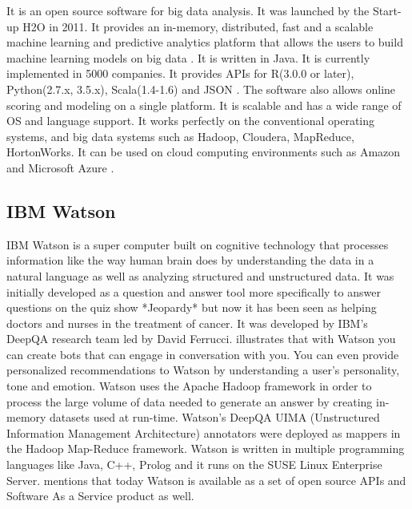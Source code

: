     It is an open source software for big data analysis. It was
    launched by the Start-up H2O in 2011. It provides an in-memory,
    distributed, fast and a scalable machine learning and predictive
    analytics platform that allows the users to build machine learning
    models on big data \cite{www-H2O-website}. It is written in
    Java. It is currently implemented in 5000 companies. It provides
    APIs for R(3.0.0 or later), Python(2.7.x, 3.5.x), Scala(1.4-1.6)
    and JSON \cite{www-H2O-book}. The software also allows online
    scoring and modeling on a single platform.  It is scalable and has
    a wide range of OS and language support. It works perfectly on the
    conventional operating systems, and big data systems such as
    Hadoop, Cloudera, MapReduce, HortonWorks.  It can be used on cloud
    computing environments such as Amazon and Microsoft Azure
    \cite{www-H2O-wiki}.


\subsection{IBM Watson \cv}

    IBM Watson \cite{www-ibmwatson-wiki} is a super computer built on
    cognitive technology that processes information like the way human
    brain does by understanding the data in a natural language as well
    as analyzing structured and unstructured data. It was initially
    developed as a question and answer tool more specifically to
    answer questions on the quiz show *Jeopardy* but now it has been
    seen as helping doctors and nurses in the treatment of cancer. It
    was developed by IBM's DeepQA research team led by David
    Ferrucci. \cite{www-ibmwatson} illustrates that with Watson you
    can create bots that can engage in conversation with you. You can
    even provide personalized recommendations to Watson by
    understanding a user's personality, tone and emotion. Watson uses
    the Apache Hadoop framework in order to process the large volume
    of data needed to generate an answer by creating in-memory
    datasets used at run-time. Watson's DeepQA UIMA (Unstructured
    Information Management Architecture) annotators were deployed as
    mappers in the Hadoop Map-Reduce framework. Watson is written in
    multiple programming languages like Java, C++, Prolog and it runs
    on the SUSE Linux Enterprise Server. \cite{www-ibmwatson}
    mentions that today Watson is available as a set of open source
    APIs and Software As a Service product as well.
    
